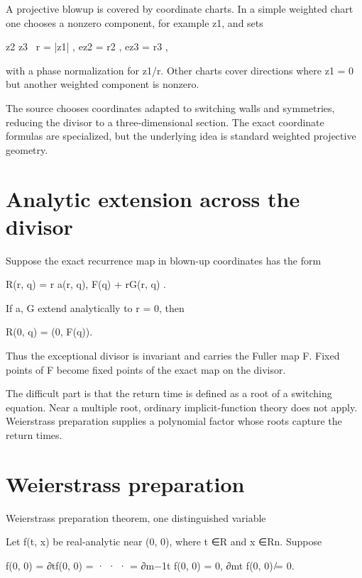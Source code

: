 A projective blowup is covered by coordinate charts. In a simple weighted chart one chooses a nonzero component, for example z1, and sets


\begin{displaytext}
z2 z3 \
r = |z1| , ez2 = r2 , ez3 = r3 ,
\end{displaytext}

with a phase normalization for z1/r. Other charts cover directions where z1 = 0 but another weighted component is nonzero.


The source chooses coordinates adapted to switching walls and symmetries, reducing the divisor to a three-dimensional section. The exact coordinate formulas are specialized, but the underlying idea is standard weighted projective geometry.


\section{Analytic extension across the divisor}

Suppose the exact recurrence map in blown-up coordinates has the form


R(r, q) = r a(r, q), F(q) + rG(r, q) .


If a, G extend analytically to r = 0, then


R(0, q) = (0, F(q)).


Thus the exceptional divisor is invariant and carries the Fuller map F. Fixed points of F become fixed points of the exact map on the divisor.


The difficult part is that the return time is defined as a root of a switching equation. Near a multiple root, ordinary implicit-function theory does not apply. Weierstrass preparation supplies a polynomial factor whose roots capture the return times.


\section{Weierstrass preparation}

Weierstrass preparation theorem, one distinguished variable


\begin{displaytext}
Let f(t, x) be real-analytic near (0, 0), where t ∈R and x ∈Rn. Suppose
\end{displaytext}

\begin{displaytext}
f(0, 0) = ∂tf(0, 0) = · · · = ∂m−1t f(0, 0) = 0, ∂mt f(0, 0) ̸= 0.
\end{displaytext}

